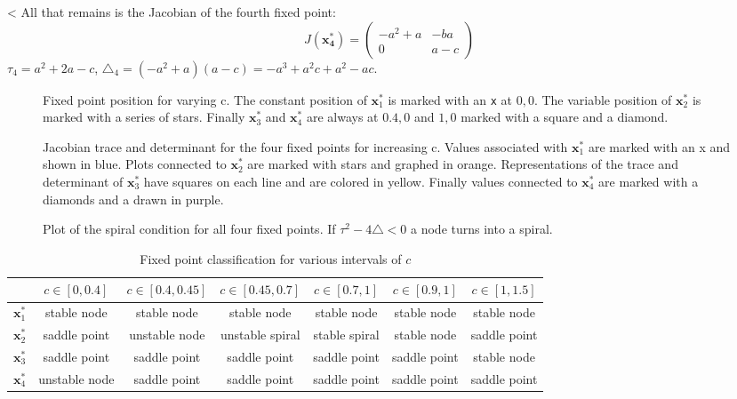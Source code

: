 <
All that remains is the Jacobian of the fourth fixed point:
\begin{equation}
J(\mathbf{x_4^*}) = \begin{pmatrix}
-a ^2 + a & -ba \\
0 & a-c 
\end{pmatrix}
\label{eq:Jx4}
\end{equation}
$\tau_4 = a^2 + 2a -c$, $\triangle_4 = (-a ^2 + a)(a-c)= -a^3 + a^2c + a^2 - ac$. 

\begin{figure}
\centering

\caption{Fixed point position for varying c. The constant position of $\mathbf{x}_1^*$ is marked with an \texttt{x} at $0,0$. The variable position of $\mathbf{x}_2^*$ is marked with a series of stars. Finally $\mathbf{x}_3^*$ and $\mathbf{x}_4^*$ are always at $0.4,0$ and $1,0$ marked with a square and a diamond.}
\label{fig:fixedPos}




\caption{Jacobian trace and determinant for the four fixed points for increasing c. Values associated with $\mathbf{x}_1^*$ are marked with an x and shown in blue. Plots connected to $\mathbf{x}_2^*$ are marked with stars and graphed in orange. Representations of the trace and determinant of $\mathbf{x}_3^*$ have squares on each line and are colored in yellow. Finally values connected to $\mathbf{x}_4^*$ are marked with a diamonds and a drawn in purple.}
\end{figure}
\begin{figure}
\centering

\caption{Plot of the spiral condition for all four fixed points. If $\tau^2 - 4\triangle < 0$ a node turns into a spiral.}
\end{figure}

\begin{table}
\begin{tabular}{|c|c|c|c|c|c|c|}
\hline
				 &	$c \in [0,0.4] $ & $c \in [0.4,0.45] $ & $c \in [0.45,0.7] $ & $c \in [0.7,1]$ & $c \in [0.9,1]$ & $c \in [1,1.5] $  \\
\hline
$\mathbf{x}_1^*$ &	stable node		 &	stable node		   &	stable node 	 &	 stable node   & stable node  & stable node  	\\
\hline
$\mathbf{x}_2^*$ &	saddle point	 &	unstable node	   &	unstable spiral	 & stable spiral   & stable node  &	saddle point   \\
\hline
$\mathbf{x}_3^*$ &	saddle point	 & saddle point		   &    saddle point	 &	saddle point   & saddle point & stable node		\\
\hline
$\mathbf{x}_4^*$ &	unstable node	 &	saddle point	   &	saddle point	 & saddle point	   & saddle point & saddle point   \\
\hline
\end{tabular}
\caption{Fixed point classification for various intervals of $c$}
\label{tab:class}
\end{table}

